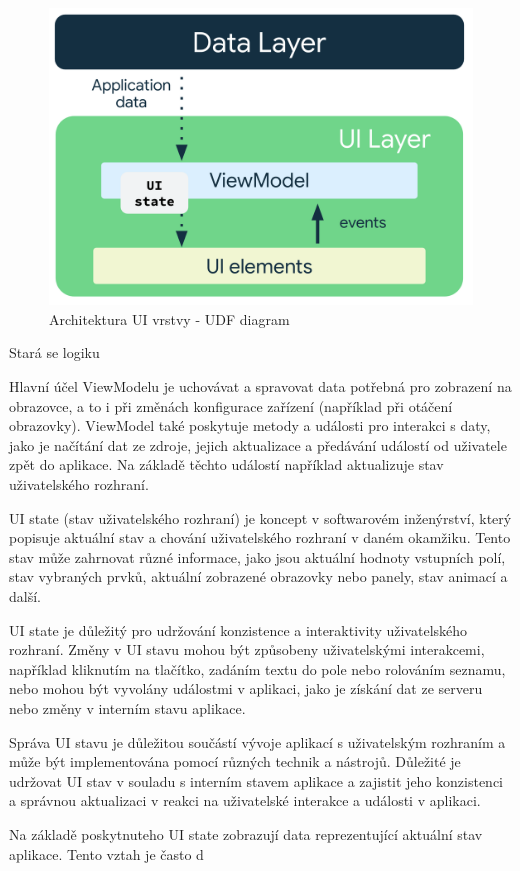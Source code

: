 \begin{figure}[H]
  \centering
  \includegraphics[width=.5\textwidth]{arch-ui-udf.png}
  \caption{Architektura UI vrstvy - UDF diagram}
  \label{fig:arch_ui_udf}
\end{figure}

Stará se logiku


Hlavní účel ViewModelu je uchovávat a spravovat data potřebná pro zobrazení na obrazovce, a to i při změnách konfigurace zařízení 
(například při otáčení obrazovky). ViewModel také poskytuje metody a události pro interakci s daty, jako je načítání dat ze zdroje, 
jejich aktualizace a předávání událostí od uživatele zpět do aplikace. Na základě těchto událostí například aktualizuje stav uživatelského
rozhraní.

 \label{UIStateParagraph}
UI state (stav uživatelského rozhraní) je koncept v softwarovém inženýrství, který popisuje aktuální stav a chování uživatelského 
rozhraní v daném okamžiku. Tento stav může zahrnovat různé informace, jako jsou aktuální hodnoty vstupních polí, stav vybraných prvků,
 aktuální zobrazené obrazovky nebo panely, stav animací a další.

UI state je důležitý pro udržování konzistence a interaktivity uživatelského rozhraní. Změny v UI stavu mohou být způsobeny uživatelskými
interakcemi, například kliknutím na tlačítko, zadáním textu do pole nebo rolováním seznamu, nebo mohou být vyvolány událostmi v aplikaci,
jako je získání dat ze serveru nebo změny v interním stavu aplikace.

Správa UI stavu je důležitou součástí vývoje aplikací s uživatelským rozhraním a může být implementována pomocí různých technik a nástrojů.
Důležité je udržovat UI stav v souladu s interním stavem aplikace a zajistit jeho konzistenci a správnou aktualizaci v reakci na uživatelské 
interakce a události v aplikaci.

Na základě poskytnuteho UI state zobrazují data reprezentující aktuální stav aplikace. Tento vztah je často d


